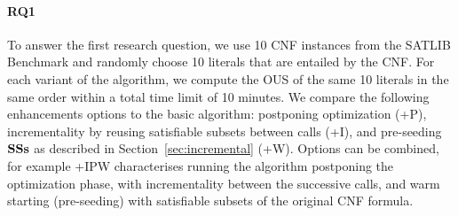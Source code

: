 \paragraph{RQ1}
To answer the first research question, we use 10 CNF instances from the SATLIB Benchmark and randomly choose 10 literals that are entailed by the CNF. For each variant of the algorithm, we compute the OUS of the same 10 literals in the same order within a total time limit of 10 minutes. 
We compare the following enhancements options to the basic \omus algorithm: postponing optimization (+P), incrementality by reusing satisfiable subsets between \omus calls (+I), and pre-seeding $\mathbf{SSs}$ as described in Section~\ref{sec:incremental} (+W). Options can be combined, for example {\omus}+IPW characterises running the \omus algorithm postponing the optimization phase, with incrementality between the successive calls, and warm starting (pre-seeding) with satisfiable subsets of the original CNF formula.



